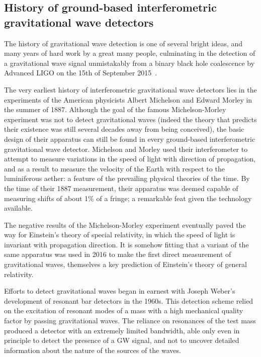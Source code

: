 \newpage

\subsection{History of ground-based interferometric gravitational wave detectors}\label{subsec:prehistory}
The history of gravitational wave detection is one of several bright ideas, and many years of hard work by a great many people,   
culminating in the detection of a gravitational wave signal unmistakably from a binary black hole coalescence 
 by Advanced LIGO on the 15th of September 2015~\cite{GW150914}. 

The very earliest history of interferometric gravitational wave detectors lies in the experiments 
of the American physicists Albert Michelson and Edward Morley in the summer of 1887. Although 
the goal of the famous Michelson-Morley experiment was not to detect gravitational waves (indeed 
the theory that predicts their existence was still several decades away from being conceived), the basic 
design of their apparatus can still be found in every ground-based interferometric gravitational wave detector. 
Michelson and Morley used their interferometer to attempt to measure variations in the speed of 
light with direction of propagation, and as a result to measure the velocity of the Earth with respect to the 
luminiferous aether: a feature of the prevailing physical theories of the time. By the time of their 1887 measurement, 
their apparatus was deemed capable of measuring shifts of about 1\% of a fringe; a remarkable feat given the 
technology available. 

The negative results of the Michelson-Morley experiment eventually paved the way for Einstein's theory of special 
relativity, in which the speed of light is invariant with propagation direction. It is somehow fitting that a variant 
of the same apparatus was used in 2016 to make the first direct measurement of gravitational waves, themselves 
a key prediction of Einstein's theory of general relativity. 


Efforts to detect gravitational waves began in earnest with Joseph Weber's development of resonant bar detectors 
in the 1960s. This detection scheme relied on the excitation of resonant modes of a mass with a high mechanical 
quality factor by passing gravitational waves. The reliance on resonances of the test mass produced a detector 
with an extremely limited bandwidth, able only even in principle to detect the presence of a GW signal, and not 
to uncover detailed information about the nature of the sources of the waves. 

